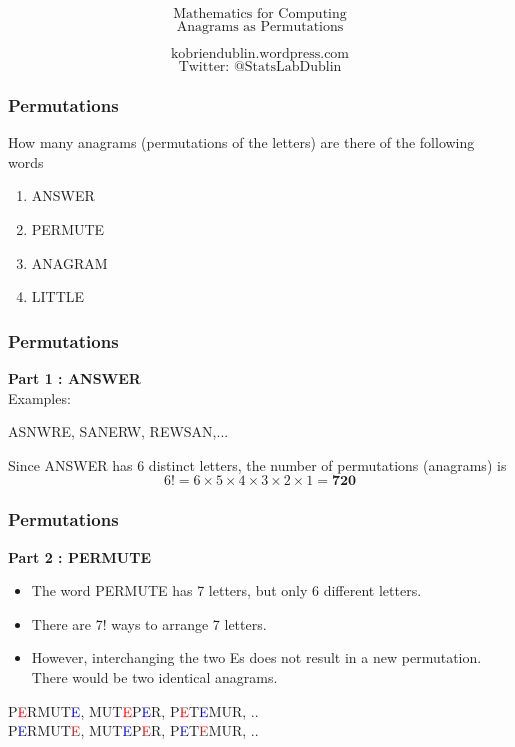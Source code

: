 \documentclass{beamer}
\begin{document}
\begin{frame}
\Huge
\[ \mbox{Mathematics for Computing} \]
\huge
\[ \mbox{Anagrams as Permutations} \]

\Large
\[ \mbox{kobriendublin.wordpress.com} \]
\[ \mbox{Twitter: @StatsLabDublin} \]

\end{frame}
\begin{frame}
\frametitle{Permutations}
\Large
\vspace{-2cm}
How many anagrams (permutations of the letters) are there of the following words
\begin{enumerate}
\item ANSWER
\item PERMUTE
\item ANAGRAM
\item LITTLE
\end{enumerate}

\end{frame}
\begin{frame}
\frametitle{Permutations}
\Large
\vspace{-2cm}
\textbf{Part 1 : ANSWER}\\
Examples:
\begin{center}
ASNWRE,\;
SANERW,\;
REWSAN,\;...
\end{center}

Since ANSWER has 6 distinct letters, the number of permutations (anagrams) is
\LARGE
\[6! = 6\times 5 \times 4 \times 3 \times 2\times 1 = \boldsymbol{720} \]
\end{frame}
\begin{frame}
\frametitle{Permutations}
\Large
\vspace{-0.3cm}
\textbf{Part 2 : PERMUTE}\\
\begin{itemize}
\item The word PERMUTE has 7 letters, but only 6 different letters. 
\item There are 7! ways to arrange 7 letters.
\item However, interchanging the two Es does not result in a new permutation. There would be two identical anagrams.
\end{itemize}

\begin{center}
P\textcolor{red}{E}RMUT\textcolor{blue}{E}, \; MUT\textcolor{red}{E}P\textcolor{blue}{E}R, \; P\textcolor{red}{E}T\textcolor{blue}{E}MUR,\; ..\\
P\textcolor{blue}{E}RMUT\textcolor{red}{E}, \; MUT\textcolor{blue}{E}P\textcolor{red}{E}R, \; P\textcolor{blue}{E}T\textcolor{red}{E}MUR,\; ..
\end{center}
\end{frame}
\end{document}
